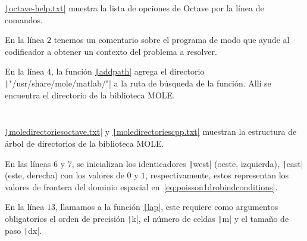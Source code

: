 \begin{problem}
\begin{listing}[ht!]
    \tiny
    \centering
    \inputminted{text}{octave-help.txt}
    \caption{\href{https://raw.githubusercontent.com/carlosal1015/mole_examples/refs/heads/main/homework/octave-help.txt}{\texttt|octave-help.txt|}
        muestra la lista de opciones de Octave por la línea de comandos.}
\end{listing}

En la línea $2$ tenemos un comentario sobre el programa de modo que
ayude al codificador a obtener un contexto del problema a resolver.



En la línea $4$, la función
\href{https://docs.octave.org/v9.3.0/Manipulating-the-Load-Path.html#index-addpath}{\texttt|addpath|}
agrega el directorio \texttt|"/usr/share/mole/matlab/"| a la ruta de búsqueda de la función.
Allí se encuentra el directorio de la biblioteca MOLE.

\begin{listing}[ht!]
    \tiny
    \centering
    \inputminted{text}{moledirectoriesoctave.txt}
    \inputminted{text}{moledirectoriescpp.txt}
    \caption{\href{https://raw.githubusercontent.com/carlosal1015/mole_examples/refs/heads/main/homework/moledirectoriesoctave.txt}{\texttt|moledirectoriesoctave.txt|}
        y \href{https://raw.githubusercontent.com/carlosal1015/mole_examples/refs/heads/main/homework/moledirectoriescpp.txt}{\texttt|moledirectoriescpp.txt|}
        muestran la estructura de árbol de directorios de la biblioteca MOLE.}
\end{listing}

En las líneas $6$ y $7$, se inicializan los identicadores
\texttt|west| (oeste, izquierda),
\texttt|east| (este, derecha) con los valores de $0$ y
$1$, respectivamente, estos representan los valores de frontera del
dominio espacial en~\eqref{eq:poisson1drobindconditions}.

En la línea $13$, llamamos a la función
\href{https://carlosal1015.github.io/mole_examples/api_docs/matlab/src/matlab/lap.html}{\texttt|lap|},
este requiere como argumentos obligatorios el orden de precisión
\texttt|k|, el número  de celdas \texttt|m| y
el tamaño de paso \texttt|dx|.


\end{problem}
